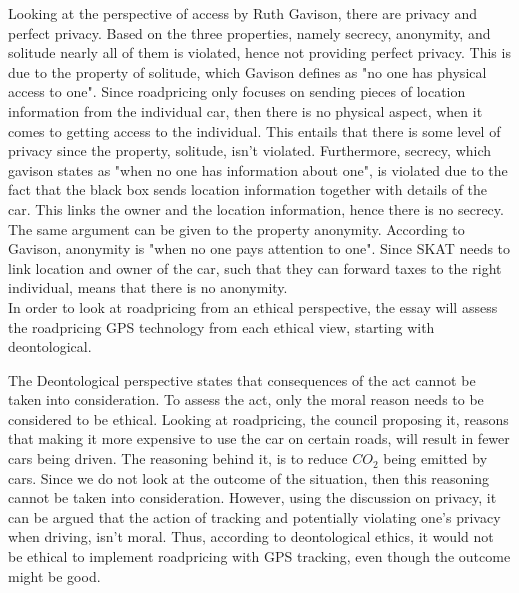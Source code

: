 Looking at the perspective of access by Ruth Gavison, there are privacy and perfect privacy. Based on the three properties, namely secrecy, anonymity, and solitude nearly all of them is violated, hence not providing perfect privacy. This is due to the property of solitude, which Gavison defines as "no one has physical access to one". Since roadpricing only focuses on sending pieces of location information from the individual car, then there is no physical aspect, when it comes to getting access to the individual. This entails that there is some level of privacy since the property, solitude, isn't violated. Furthermore, secrecy, which gavison states as "when no one has information about one", is violated due to the fact that the black box sends location information together with details of the car. This links the owner and the location information, hence there is no secrecy. The same argument can be given to the property anonymity. According to Gavison, anonymity is "when no one pays attention to one". Since SKAT needs to link location and owner of the car, such that they can forward taxes to the right individual, means that there is no anonymity.  \\


\noindent In order to look at roadpricing from an ethical perspective, the essay will assess the roadpricing GPS technology from each ethical view, starting with deontological.

 The Deontological perspective states that consequences of the act cannot be taken into consideration. To assess the act, only the moral reason needs to be considered to be ethical. Looking at roadpricing, the council proposing it, reasons that making it more expensive to use the car on certain roads, will result in fewer cars being driven. The reasoning behind it, is to reduce $CO_2$ being emitted by cars. Since we do not look at the outcome of the situation, then this reasoning cannot be taken into consideration. However, using the discussion on privacy, it can be argued that the action of tracking and potentially violating one's privacy when driving, isn't moral. Thus, according to deontological ethics, it would not be ethical to implement roadpricing with GPS tracking, even though the outcome might be good.

